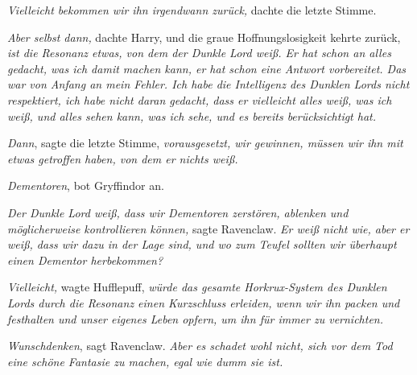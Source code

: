 \emph{Vielleicht bekommen wir ihn irgendwann zurück,} dachte die letzte Stimme.

\emph{Aber selbst dann,} dachte Harry, und die graue Hoffnungslosigkeit kehrte zurück, \emph{ist die Resonanz etwas, von dem der Dunkle Lord weiß. Er hat schon an alles gedacht, was ich damit machen kann, er hat schon eine Antwort vorbereitet. Das war von Anfang an mein Fehler. Ich habe die Intelligenz des Dunklen Lords nicht respektiert, ich habe nicht daran gedacht, dass er vielleicht alles weiß, was ich weiß, und alles sehen kann, was ich sehe, und es bereits berücksichtigt hat.}

\emph{Dann}, sagte die letzte Stimme, \emph{vorausgesetzt, wir gewinnen, müssen wir ihn mit etwas getroffen haben, von dem er nichts weiß.}

\emph{Dementoren}, bot Gryffindor an.

\emph{Der Dunkle Lord \emph{weiß}, dass wir Dementoren zerstören, ablenken und möglicherweise kontrollieren können,} sagte Ravenclaw. \emph{Er weiß nicht wie, aber er weiß, dass wir dazu in der Lage sind, und wo zum Teufel sollten wir überhaupt einen Dementor herbekommen?}

\emph{Vielleicht,} wagte Hufflepuff, \emph{würde das gesamte Horkrux-System des Dunklen Lords durch die Resonanz einen Kurzschluss erleiden, wenn wir ihn packen und festhalten und unser eigenes Leben opfern, um ihn für immer zu vernichten.}

\emph{Wunschdenken}, sagt Ravenclaw. \emph{Aber es schadet wohl nicht, sich vor dem Tod eine schöne Fantasie zu machen, egal wie dumm sie ist.}

